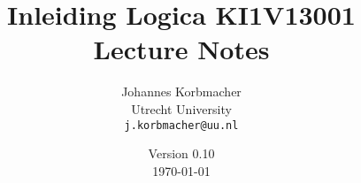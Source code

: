 \title{%
  Inleiding Logica KI1V13001\\[2ex]
  Lecture Notes
}
	
\author{Johannes Korbmacher\\
  Utrecht University \\[2ex]
  \texttt{j.korbmacher@uu.nl}
}

\date{Version 0.10\\
  [2ex]\today
}

